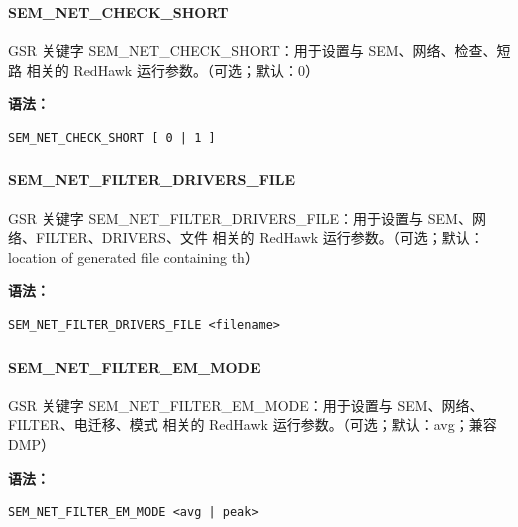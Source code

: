 \subsubsection{}
\paragraph*{SEM_NET_CHECK_SHORT}

GSR 关键字 SEM_NET_CHECK_SHORT：用于设置与 SEM、网络、检查、短路 相关的 RedHawk 运行参数。（可选；默认：0）

\textbf{语法：}
\begin{lstlisting}
SEM_NET_CHECK_SHORT [ 0 | 1 ]
\end{lstlisting}

\subsubsection{}
\paragraph*{SEM_NET_FILTER_DRIVERS_FILE}

GSR 关键字 SEM_NET_FILTER_DRIVERS_FILE：用于设置与 SEM、网络、FILTER、DRIVERS、文件 相关的 RedHawk 运行参数。（可选；默认：location of generated file containing th）

\textbf{语法：}
\begin{lstlisting}
SEM_NET_FILTER_DRIVERS_FILE <filename>
\end{lstlisting}

\subsubsection{}
\paragraph*{SEM_NET_FILTER_EM_MODE}

GSR 关键字 SEM_NET_FILTER_EM_MODE：用于设置与 SEM、网络、FILTER、电迁移、模式 相关的 RedHawk 运行参数。（可选；默认：avg；兼容 DMP）

\textbf{语法：}
\begin{lstlisting}
SEM_NET_FILTER_EM_MODE <avg | peak>
\end{lstlisting}

\subsubsection{}
